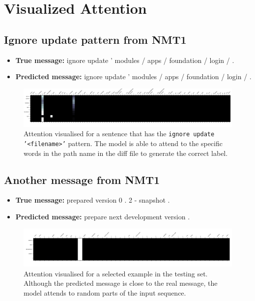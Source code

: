 \onecolumn\appendix

\section{Visualized Attention}

\subsection{Ignore update pattern from NMT1}\label{app:vis:ignore}
\begin{itemize}
    \item \textbf{True message:} ignore update ' modules / apps / foundation / login / .
    \item \textbf{Predicted message:} ignore update ' modules / apps / foundation / login / .
\end{itemize}

\begin{figure}[H]
    \centering
        \includegraphics[width=\textwidth]{figs/ignore_attention.png}
        \caption{Attention visualised for a sentence that has the \texttt{ignore update '<filename>'} pattern. The model is able to attend to the specific words in the path name in the diff file to generate the correct label.}
        \label{fig:ignore}
\end{figure}
    
\subsection{Another message from NMT1}\label{app:vis:prepare}
\begin{itemize}
    \item \textbf{True message:} prepared version 0 . 2 - snapshot .
    \item \textbf{Predicted message:} prepare next development version .
\end{itemize}
\begin{figure}[H]
        \includegraphics[width=\textwidth]{figs/prepare_attention.png}
        \caption{Attention visualised for a selected example in the testing set. Although the predicted message is close to the real message, the model attends to random parts of the input sequence.}
        \label{fig:prepare}
\end{figure}

